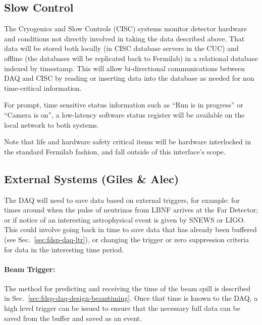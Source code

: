 \subsection{Slow Control}
\label{sec:fdsp-daq-intfc-ext}

The Cryogenics and Slow Controls (CISC) systems monitor detector
hardware and conditions not directly involved in taking the data
described above.  That data will be stored both locally (in CISC
database servers in the CUC) and offline (the databases will be
replicated back to Fermilab) in a relational database indexed by
timestamp.  This will allow bi-directional communications between DAQ
and CISC by reading or inserting data into the database as needed for
non time-critical information.  

For prompt, time sensitive status information such as ``Run is in
progress'' or ``Camera is on'', a low-latency software status register
will be available on the local network to both systems.

Note that life and hardware safety critical items will be hardware
interlocked in the standard Fermilab fashion, and fall outside of this
interface's scope.


\subsection{External Systems (Giles \& Alec)}
\label{sec:fdsp-daq-intfc-ext}


The DAQ will need to save data based on external triggers, for example:
for times around when the pulse of neutrinos from LBNF arrives at the
Far Detector; or if notice of an interesting astrophysical event is
given by SNEWS\cite{snews} or LIGO.  This could involve going back in
time to save data that has already been buffered (see
Sec.~\ref{sec:fdsp-daq-ltr}), or changing the trigger or zero
suppression criteria for data in the interesting time period.

\paragraph{Beam Trigger:} The method for predicting and receiving the
time of the beam spill is described in
Sec.~\ref{sec:fdsp-daq-design-beamtiming}.  Once that time is known to
the DAQ, a high level trigger can be issued to ensure that the necessary
full data can be saved from the buffer and saved as an event.

